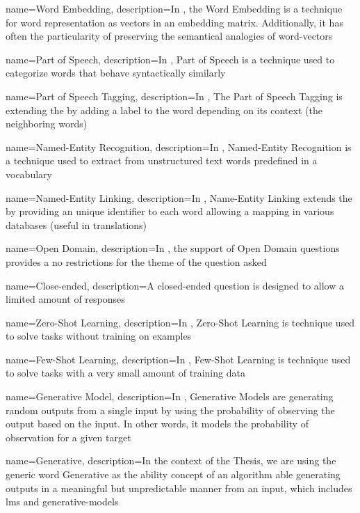 {
  name={Word Embedding},
  description={In , the Word Embedding is a technique for word representation as vectors in an embedding matrix. Additionally, it has often the particularity of preserving the semantical analogies of word-vectors}
}

{
  name={Part of Speech},
  description={In , Part of Speech is a technique used to categorize words that behave syntactically similarly}
}

{
  name={Part of Speech Tagging},
  description={In , The Part of Speech Tagging is extending the  by adding a label to the word depending on its context (the neighboring words)}
}


{
  name={Named-Entity Recognition},
  description={In , Named-Entity Recognition is a technique used to extract from unstructured text words predefined in a vocabulary}
}

{
  name={Named-Entity Linking},
  description={In , Name-Entity Linking extends the  by providing an unique identifier to each word allowing a mapping in various databases (useful in translations)}
}

{
  name={Open Domain},
  description={In , the support of Open Domain questions provides a no restrictions for the theme of the question asked}
}

{
  name={Close-ended},
  description={A closed-ended question is designed to allow a limited amount of responses}
}

{
  name={Zero-Shot Learning},
  description={In , Zero-Shot Learning is technique used to solve tasks without training on examples}
}

{
  name={Few-Shot Learning},
  description={In , Few-Shot Learning is technique used to solve tasks with a very small amount of training data}
}

{
  name={Generative Model},
  description={In , Generative Models are generating random outputs from a single input by using the probability of observing the output based on the input. In other words, it models the probability of observation for a given target}
}

{
  name={Generative},
  description={In the context of the Thesis, we are using the generic word Generative as the ability concept of an algorithm able generating outputs in a meaningful but unpredictable manner from an input, which includes \glspl{lm} and \glspl{generative-model}}
}

